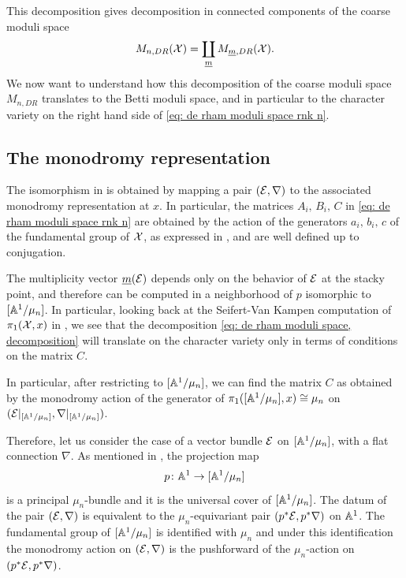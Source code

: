 This decomposition gives decomposition in connected components of the coarse moduli space
\begin{equation} \label{eq: de rham moduli space, decomposition}
M_{n, DR}(\mathcal{X}) = \coprod_{\underline{m}} M_{\underline{m}, DR}(\mathcal{X}).
\end{equation}
We now want to understand how this decomposition of the coarse moduli space $M_{n, DR}$ translates to the Betti moduli space, and in particular to the character variety on the right hand side of \eqref{eq: de rham moduli space rnk n}.

\subsection{The monodromy representation}
The isomorphism in  is obtained by mapping a pair $(\mathcal{E}, \nabla)$ to the associated monodromy representation at $x$. In particular, the matrices $A_i, \, B_i, \, C$ in \eqref{eq: de rham moduli space rnk n} are obtained by the action of the generators $a_i, \, b_i, \, c$ of the fundamental group of $\mathcal{X}$, as expressed in , and are well defined up to conjugation.

The multiplicity vector $\underline{m}(\mathcal{E})$ depends only on the behavior of $\mathcal{E}$ at the stacky point, and therefore can be computed in a neighborhood of $p$ isomorphic to $[\mathbb{A}^1 / \mu_n]$. In particular, looking back at the Seifert-Van Kampen computation of $\pi_1(\mathcal{X}, x)$ in , we see that the decomposition \eqref{eq: de rham moduli space, decomposition} will translate on the character variety only in terms of conditions on the matrix $C$.

In particular, after restricting to $[\mathbb{A}^1/ \mu_n]$, we can find the matrix $C$ as obtained by the monodromy action of the generator of $\pi_1([\mathbb{A}^1 / \mu_n], x) \cong \mu_n$ on $(\mathcal{E}\vert_{[\mathbb{A}^1 / \mu_n]}, \nabla\vert_{[\mathbb{A}^1 / \mu_n]})$.

Therefore, let us consider the case of a vector bundle $\mathcal{E}$ on $[\mathbb{A}^1 / \mu_n]$, with a flat connection $\nabla$.
As mentioned in , the projection map
\begin{equation}
p \colon \mathbb{A}^1 \to [\mathbb{A}^1 / \mu_n]
\end{equation}
is a principal $\mu_n$-bundle and it is the universal cover of $[\mathbb{A}^1 / \mu_n]$. The datum of the pair $(\mathcal{E}, \nabla)$ is equivalent to the $\mu_n$-equivariant pair $(p^*\mathcal{E}, p^*\nabla)$ on $\mathbb{A}^1$. The fundamental group of $[\mathbb{A}^1 / \mu_n]$ is identified with $\mu_n$ and under this identification the monodromy action on $(\mathcal{E}, \nabla)$ is the pushforward of the $\mu_n$-action on $(p^*\mathcal{E}, p^*\nabla)$.

